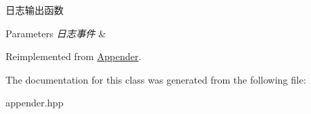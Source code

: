 日志输出函数 


\begin{DoxyParams}{Parameters}
{\em 日志事件} & \\
\hline
\end{DoxyParams}


Reimplemented from \hyperlink{classAppender_a3bfa17781e5b6102667725a5d23b394a}{Appender}.



The documentation for this class was generated from the following file\+:\begin{DoxyCompactItemize}
\item 
appender.\+hpp\end{DoxyCompactItemize}
